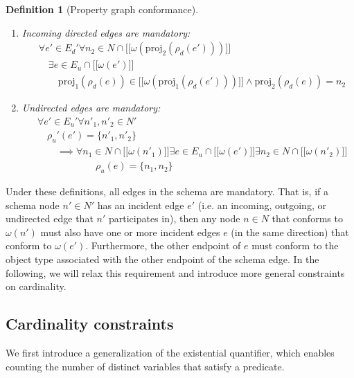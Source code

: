 \documentclass[a4paper]{article}
\newtheorem{definition}[theorem]{Definition}
\newcommand{\proj}{\mathrm{proj}}
\newcommand{\lsem}{\ensuremath{[\![}}
\newcommand{\rsem}{\ensuremath{]\!]}}
\newcommand{\sem}[1]{\ensuremath{\lsem #1 \rsem}}
\begin{document}
\begin{definition}[Property graph conformance]
\begin{enumerate}
    \item Incoming directed edges are mandatory:
    \begin{align*}
      &\forall e' \in E_d' \forall n_2 \in N \cap \sem{\omega(\proj_2(\rho_d(e')))}\\
      &\quad\exists e \in E_u \cap \sem{\omega(e')}\\
      &\quad\quad \proj_1(\rho_d(e)) \in \sem{\omega(\proj_1(\rho_d(e')))} \wedge \proj_2(\rho_d(e)) = n_2
    \end{align*}
    
    \item Undirected edges are mandatory:
    \begin{align*}
      &\forall e' \in E_u' \forall n'_1, n'_2 \in N'\\
      &\quad\rho_u'(e') = \{n'_1, n'_2\}\\
      &\quad\quad\implies {} \forall n_1 \in N \cap \sem{\omega(n'_1)} \exists e \in E_u \cap \sem{\omega(e')} \exists n_2 \in N \cap \sem{\omega(n'_2)}\\
      &\quad\quad\quad\quad\quad\quad\rho_u(e) = \{n_1, n_2\}
    \end{align*}
  \end{enumerate}
\end{definition}

Under these definitions, all edges in the schema are mandatory. That is, if a schema node $n' \in N'$ has an incident edge $e'$ (i.e. an incoming, outgoing, or undirected edge that $n'$ participates in), then any node $n \in N$ that conforms to $\omega(n')$ must also have one or more incident edges $e$ (in the same direction) that conform to $\omega(e')$. Furthermore, the other endpoint of $e$ must conform to the object type associated with the other endpoint of the schema edge. In the following, we will relax this requirement and introduce more general constraints on cardinality.

\subsection{Cardinality constraints}

We first introduce a generalization of the existential quantifier, which enables counting the number of distinct variables that satisfy a predicate.
\end{document}

